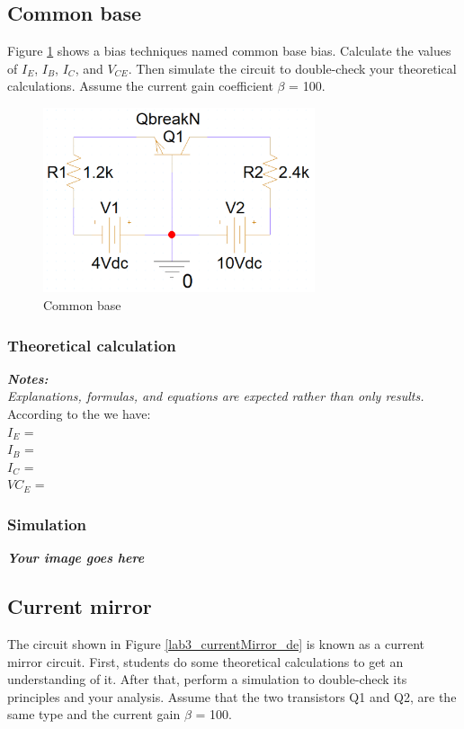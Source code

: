 \subsection{Common base}

Figure \ref{lab3_commonB_de} shows a bias techniques named common base bias.
Calculate the values of $I_E$, $I_B$, $I_C$, and $V_{CE}$. Then simulate the circuit to double-check your theoretical calculations. Assume the current gain coefficient $\beta$ = 100.

\begin{figure}[H]
    \centering
    \includegraphics[width=8cm]{source/picture/bai_3/lab3_commonBase_de.png}
    \caption{Common base}
    \label{lab3_commonB_de}
\end{figure}

\subsubsection{Theoretical calculation}
\textit{\textbf{Notes:}}\\
\textit{Explanations, formulas, and equations are expected rather than only results.}
\bigskip\\
According to the \dotfill we have: \bigskip\\
$I_E$ = \dotfill\bigskip\\
$I_B$ = \dotfill\bigskip\\
$I_C$ = \dotfill\bigskip\\
$V{C_E}$ = \dotfill\bigskip\\

\subsubsection{Simulation}
\textbf{\textit{Your image goes here}}
\vspace{8cm}
\\

\subsection{Current mirror}
The circuit shown in Figure \ref{lab3_currentMirror_de} is known as a current mirror circuit. First, students do some theoretical calculations to get an understanding of it. After that, perform a simulation to double-check its principles and your analysis. Assume that the two transistors Q1 and Q2, are the same type and the current gain $\beta$ = 100.

